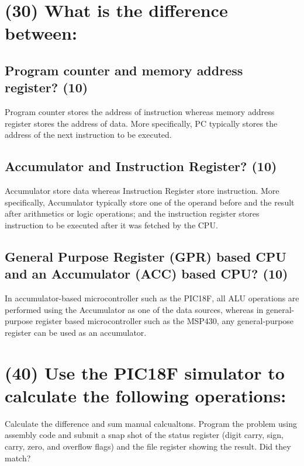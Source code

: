 \documentclass{article}
\begin{document}



\section{(30) What is the difference between:}
\subsection{Program counter and memory address register? (10)}
Program counter stores the address of instruction whereas memory address register stores the address of data. More specifically, PC typically stores the address of the next instruction to be executed. 

\newpage
\subsection{Accumulator and Instruction Register? (10)}
Accumulator store data whereas Instruction Register store instruction. More specifically, Accumulator typically store one of the operand before and the result after arithmetics or logic operations; and the instruction register stores instruction to be executed after it was fetched by the CPU.

\newpage
\subsection{General Purpose Register (GPR) based CPU and an Accumulator (ACC) based CPU? (10)}
In accumulator-based microcontroller such as the PIC18F, all ALU operations are performed using the Accumulator as one of the data sources, whereas in general-purpose register based microcontroller such as the MSP430, any general-purpose register can be used as an accumulator.

\newpage

\section{(40) Use the PIC18F simulator to calculate the following operations:}
Calculate the difference and sum manual calcualtons. Program the problem using assembly code and submit a snap shot of the status register (digit carry, sign, carry, zero, and overflow flags) and the file register showing the result. Did they match?
\end{document}
